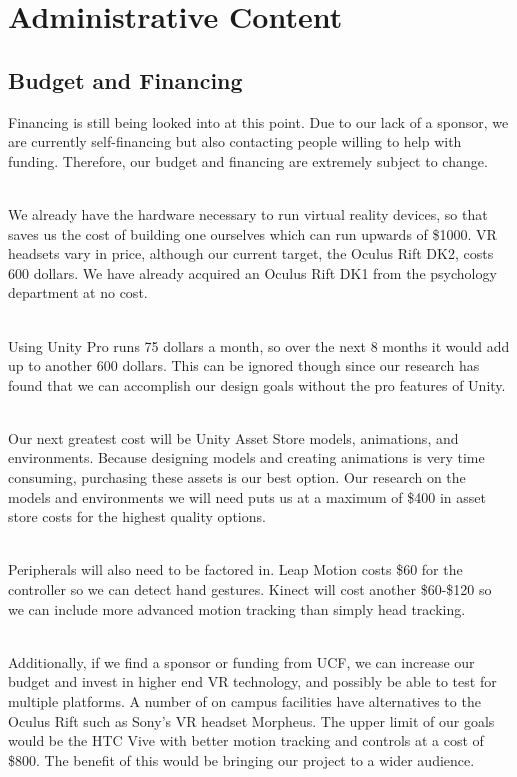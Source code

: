 \documentclass[a4paper,10pt]{article}
\begin{document}
\section{Administrative Content}
\subsection{Budget and Financing}
Financing is still being looked into at this point. Due to our lack of a sponsor, we are currently self-financing but also contacting people willing to help with funding. Therefore, our budget and financing are extremely subject to change. 
\par~\\ 
We already have the hardware necessary to run virtual reality devices, so that saves us the cost of building one ourselves which can run upwards of \$1000. VR headsets vary in price, although our current target, the Oculus Rift DK2, costs 600 dollars. We have already acquired an Oculus Rift DK1 from the psychology department at no cost.
\par~\\ 
Using Unity Pro runs 75 dollars a month, so over the next 8 months it would add up to another 600 dollars. This can be ignored though since our research has found that we can accomplish our design goals without the pro features of Unity.
\par~\\ 
Our next greatest cost will be Unity Asset Store models, animations, and environments. Because designing models and creating animations is very time consuming, purchasing these assets is our best option. Our research on the models and environments we will need puts us at a maximum of \$400 in asset store costs for the highest quality options.
\par~\\
Peripherals will also need to be factored in. Leap Motion costs \$60 for the controller so we can detect hand gestures. Kinect will cost another \$60-\$120 so we can include more advanced motion tracking than simply head tracking.
\par~\\ 
Additionally, if we find a sponsor or funding from UCF, we can increase our budget and invest in higher end VR technology, and possibly be able to test for multiple platforms. A number of on campus facilities have alternatives to the Oculus Rift such as Sony’s VR headset Morpheus. The upper limit of our goals would be the HTC Vive with better motion tracking and controls at a cost of \$800. The benefit of this would be bringing our project to a wider audience.
\end{document}
